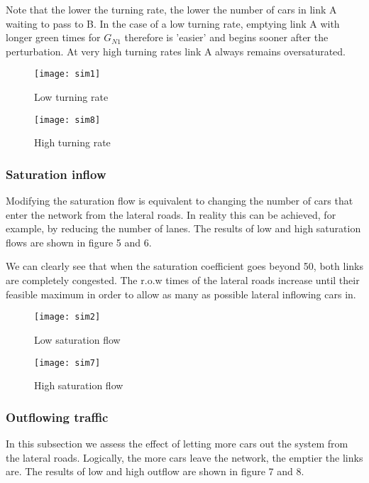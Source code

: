 \documentclass[11pt]{article}
\begin{document}
Note that the lower the turning rate, the lower the number of cars in link A waiting to pass to B. In the case of a low turning rate, emptying link A with longer green times for $G_{N1}$ therefore is 'easier' and begins sooner after the perturbation. At very high turning rates link A always remains oversaturated. %

\begin{figure}[h!]
    \caption{Low turning rate}
      \centering
	\texttt{[image: sim1]}
\end{figure}

\begin{figure}[h!]
    \caption{High turning rate}
      \centering
	\texttt{[image: sim8]}
\end{figure}


\subsubsection{Saturation inflow}

Modifying the saturation flow is equivalent to changing the number of cars that enter the network from the lateral roads. In reality this can be achieved, for example, by reducing the number of lanes. The results of low and high saturation flows are shown in figure 5 and 6.

We can clearly see that when the saturation coefficient goes beyond 50, both links are completely congested. The r.o.w times of the lateral roads increase until their feasible maximum in order to allow as many as possible lateral inflowing cars in.

\begin{figure}[h!]
    \caption{Low saturation flow}
      \centering
	\texttt{[image: sim2]}
\end{figure}

\begin{figure}[h!]

    \caption{High saturation flow}
      \centering
	\texttt{[image: sim7]}
\end{figure}

\subsubsection{Outflowing traffic}

In this subsection we assess the effect of letting more cars out the system from the lateral roads. Logically, the more cars leave the network, the emptier the links are. The results of low and high outflow are shown in figure 7 and 8.
\end{document}
